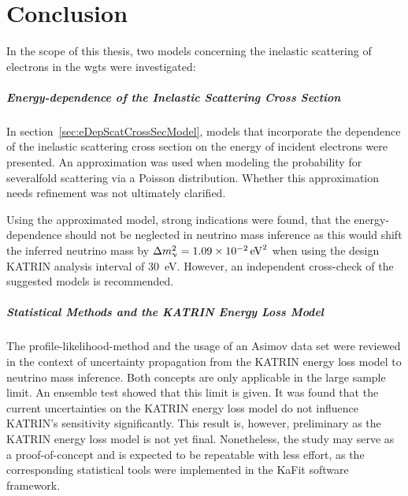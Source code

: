 \chapter{Conclusion}
\label{sec:conclusion}
In the scope of this thesis, two models concerning the inelastic scattering of electrons in the \gls{wgts} were investigated:

\paragraph{Energy-dependence of the Inelastic Scattering Cross Section}
In section~\ref{sec:eDepScatCrossSecModel}, models that incorporate the dependence of the inelastic scattering cross section on the energy of incident electrons were presented. An approximation was used when modeling the probability for severalfold scattering via a Poisson distribution. Whether this approximation needs refinement was not ultimately clarified.

Using the approximated model, strong indications were found, that the energy-dependence should not be neglected in neutrino mass inference as this would shift the inferred neutrino mass by 	$\Delta m_\upnu^2 = \SI{1.09e-2}{eV^2}$ when using the design KATRIN analysis interval of \SI{30}{eV}. However, an independent cross-check of the suggested models is recommended.

\paragraph{Statistical Methods and the KATRIN Energy Loss Model}
The profile-likelihood-method and the usage of an Asimov data set were reviewed in the context of uncertainty propagation from the KATRIN energy loss model to neutrino mass inference. Both concepts are only applicable in the large sample limit. An ensemble test showed that this limit is given. It was found that the current uncertainties on the KATRIN energy loss model do not influence KATRIN's sensitivity significantly. This result is, however, preliminary as the KATRIN energy loss model is not yet final. Nonetheless, the study may serve as a proof-of-concept and is expected to be repeatable with less effort, as the corresponding statistical tools were implemented in the KaFit software framework. 
